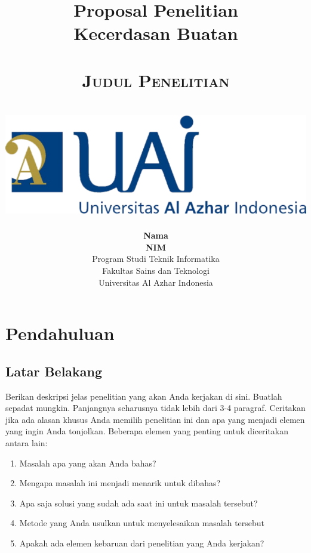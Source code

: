 \documentclass[12pt]{report}
\begin{document}
\nocite{*}

\title{Proposal Penelitian \\
Kecerdasan Buatan \\~\\
\textsc{Judul Penelitian} \\~\\
\includegraphics{uai.png}}


\author{\textbf{Nama} \\
\textbf{NIM} \\
Program Studi Teknik Informatika \\
Fakultas Sains dan Teknologi \\
Universitas Al Azhar Indonesia}

\date{\the\year}

\maketitle

\chapter{Pendahuluan}

\section{Latar Belakang} %
\label{sec:latar_belakang}

Berikan deskripsi jelas penelitian yang akan Anda kerjakan di sini. Buatlah sepadat mungkin. Panjangnya seharusnya tidak lebih dari 3-4 paragraf. Ceritakan jika ada alasan khusus Anda memilih penelitian ini dan apa yang menjadi elemen yang ingin Anda tonjolkan. Beberapa elemen yang penting untuk diceritakan antara lain:
\begin{enumerate}
    \item Masalah apa yang akan Anda bahas?
    \item Mengapa masalah ini menjadi menarik untuk dibahas?
    \item Apa saja solusi yang sudah ada saat ini untuk masalah tersebut?
    \item Metode yang Anda usulkan untuk menyelesaikan masalah tersebut
    \item Apakah ada elemen kebaruan dari penelitian yang Anda kerjakan?
\end{enumerate}
\end{document}
